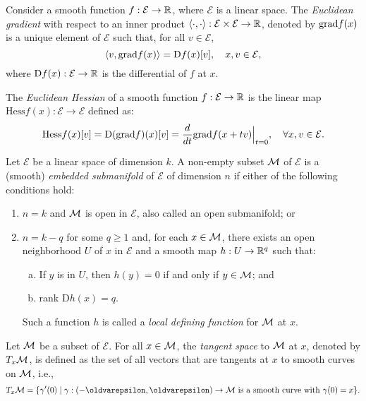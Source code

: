 \begin{definition}
    Consider a smooth function $f: \mathcal{E} \to \mathbb{R}$, where $\mathcal{E}$ is a linear space. The \textit{Euclidean gradient} with respect to an inner product $\langle \cdot, \cdot \rangle: \mathcal{E} \times \mathcal{E} \to \mathbb{R}$, denoted by $\mathrm{grad }{f}(x)$ is a unique element of $\mathcal{E}$ such that, for all $v \in \mathcal{E}$, 
    \[
        \langle v, \mathrm{grad }{f}(x) \rangle = \textrm{D}f(x)[v],\quad x,v \in \mathcal{E},
    \]
    where $\textrm{D}f(x) : \mathcal{E} \to \mathbb{R}$ is the differential of $f$ at $x$.
\end{definition}

\begin{definition}
    The \textit{Euclidean Hessian} of a smooth function $f: \mathcal{E} \to \mathbb{R}$ is the linear map $\textrm{Hess}f(x) : \mathcal{E} \to \mathcal{E}$ defined as:
    \[
        \textrm{Hess}f(x)[v] = \textrm{D}(\grad{f})(x)[v] = \frac{d}{dt} \grad{f}(x + tv) \Big|_{t = 0}, \quad \forall x,v \in \mathcal{E}.
    \]
\end{definition}

\begin{definition}
    Let $\mathcal{E}$ be a linear space of dimension $k$. A non-empty subset $\mathcal{M}$ of $\mathcal{E}$ is a (smooth) \textit{embedded submanifold} of $\mathcal{E}$ of dimension $n$ if either of the following conditions hold:
    \begin{enumerate}
        \item $n=k$ and $\mathcal{M}$ is open in $\mathcal{E}$, also called an open submanifold; or 
        \item $n=k-q$ for some $q \geq 1$ and, for each $x \in \mathcal{M}$, there exists an open neighborhood $U$ of $x$ in $\mathcal{E}$ and a smooth map $h : U \to \mathbb{R}^q$ such that:
        \begin{enumerate}[(a)]
            \item If $y$ is in $U$, then $h(y) = 0$ if and only if $y \in \mathcal{M}$; and
            \item \textrm{rank} $\textrm{D}h(x) = q$.
        \end{enumerate}
        Such a function $h$ is called a \emph{local defining function} for $\mathcal{M}$ at $x$.
    \end{enumerate}
    
\end{definition}

\begin{definition}
   Let $\mathcal{M}$ be a subset of $\mathcal{E}$. For all $x \in \mathcal{M}$, the \textit{tangent space} to $\mathcal{M}$ at $x$, denoted by $T_x \mathcal{M}$, is defined as the set of all vectors that are tangents at $x$ to smooth curves on $\mathcal{M}$, i.e.,
   \[
        T_x \M = \{ \gamma'(0) \mid \gamma : (-\epsilon, \epsilon) \to \M \textrm{ is a smooth curve with } \gamma(0) = x \}.
   \]
\end{definition}

